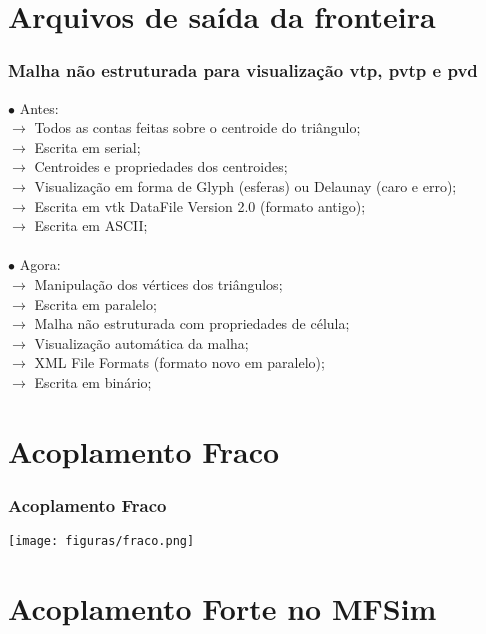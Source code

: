 \documentclass[xcolor=dvipsnames,10pt,aspectratio=169]{beamer}
\begin{document}
		\section{ Arquivos de saída da fronteira}
		\begin{frame}
			\frametitle{Malha não estruturada para visualização vtp, pvtp e pvd}
			
			$\bullet$ Antes:\\
			$\longrightarrow$	Todos as contas feitas sobre o centroide do triângulo;\\
			$\longrightarrow$	Escrita em serial;\\
			$\longrightarrow$	Centroides e propriedades dos centroides;\\
			$\longrightarrow$	Visualização em forma de Glyph (esferas) ou Delaunay (caro e erro);\\
			$\longrightarrow$	Escrita em vtk DataFile Version 2.0 (formato antigo);\\
			$\longrightarrow$	Escrita em ASCII; \\
			\\ 
			$\bullet$ Agora: \\
			$\longrightarrow$ Manipulação dos vértices dos triângulos;\\
			$\longrightarrow$ Escrita em paralelo;\\
			$\longrightarrow$ Malha não estruturada com propriedades de célula;\\
			$\longrightarrow$ Visualização automática da malha;\\
			$\longrightarrow$ XML File Formats (formato novo em paralelo);\\
			$\longrightarrow$ Escrita em binário;
			
		\end{frame}
	
		\section{Acoplamento Fraco}
		\begin{frame}
			\frametitle{Acoplamento Fraco}
			\texttt{[image: figuras/fraco.png]}
	
		\end{frame}
	
		\section{Acoplamento Forte no MFSim}
		
\end{document}
